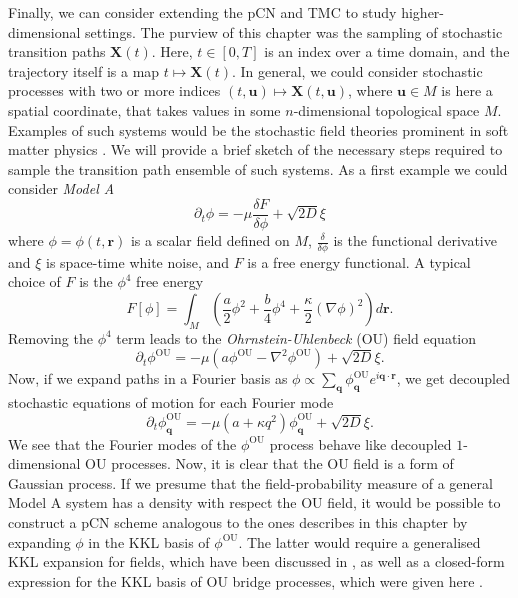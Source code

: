 Finally, we can consider extending the pCN and TMC to study higher-dimensional settings. The purview of this chapter was the sampling of stochastic transition paths $\mathbf{X}(t)$. Here, $t \in [0, T]$ is an index over a time domain, and the trajectory itself is a map $t \mapsto \mathbf{X}(t)$. In general, we could consider stochastic processes with two or more indices $(t, \mathbf{u}) \mapsto \mathbf{X}(t, \mathbf{u})$, where $\mathbf{u} \in M$ is here a spatial coordinate, that takes values in some $n$-dimensional topological space $M$. Examples of such systems would be the stochastic field theories prominent in soft matter physics \citep{catesTheoriesBinaryFluid2018a, tiribocchiActiveModelScalar2015, stenhammarContinuumTheoryPhase2013, wittkowskiScalarF4Field2014, deanLangevinEquationDensity1996}. We will provide a brief sketch of the necessary steps required to sample the transition path ensemble of such systems. As a first example we could consider \textit{Model A} \citep{catesActiveFieldTheories2019}
\begin{equation}
	\partial_t \phi = - \mu \frac{\delta F}{\delta \phi} + \sqrt{2 D} \xi 
\end{equation}
where $\phi = \phi(t, \mathbf{r})$ is a scalar field defined on $M$, $\frac{\delta}{\delta \phi}$ is the functional derivative and $\xi$ is space-time white noise, and $F$ is a free energy functional. A typical choice of $F$ is the $\phi^4$ free energy
\begin{equation}
	F[\phi] = \int_M \left( \frac{a}{2} \phi^2 + \frac{b}{4} \phi^4 + \frac{\kappa}{2} (\nabla \phi)^2 \right) d \mathbf{r}.
\end{equation}
Removing the $\phi^4$ term leads to the \textit{Ohrnstein-Uhlenbeck} (OU) \citep{gardinerHandbookStochasticMethods1990} field equation
\begin{equation} \label{eq:OU process field}
	\partial_t \phi^\text{OU} = - \mu (a \phi^\text{OU} - \nabla^2 \phi^\text{OU}) + \sqrt{2D} \xi.
\end{equation}
Now, if we expand paths in a Fourier basis as $\phi \propto \sum_\mathbf{q} \phi^\text{OU}_\mathbf{q} e^{i \mathbf{q} \cdot \mathbf{r}}$, we get decoupled stochastic equations of motion for each Fourier mode
\begin{equation}
	\partial_t \phi^\text{OU}_\mathbf{q} = - \mu (a + \kappa q^2) \phi^\text{OU}_\mathbf{q} + \sqrt{2D} \xi.
\end{equation}
We see that the Fourier modes of the $\phi^\text{OU}$ process behave like decoupled $1$-dimensional OU processes. Now, it is clear that the OU field is a form of Gaussian process. If we presume that the field-probability measure of a general Model A system has a density with respect the OU field, it would be possible to construct a pCN scheme analogous to the ones describes in this chapter by expanding $\phi$ in the KKL basis of $\phi^\text{OU}$. The latter would require a generalised KKL expansion for fields, which have been discussed in \citep{wangKarhunenLoeveExpansionsTheir2008}, as well as a closed-form expression for the KKL basis of OU bridge processes, which were given here \citep{corlayPropertiesOrnsteinUhlenbeckBridge2014a}.



